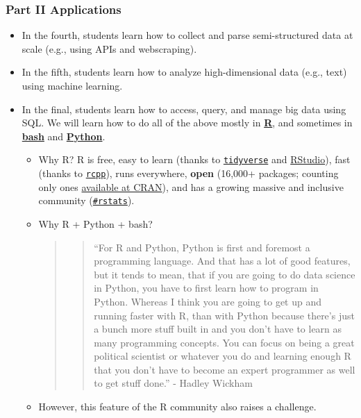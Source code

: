 \documentclass[
]{article}
\begin{document}
\hypertarget{part-ii-applications}{%
\subsubsection{Part II Applications}\label{part-ii-applications}}

\begin{itemize}
\item
  In the fourth, students learn how to collect and parse semi-structured
  data at scale (e.g., using APIs and webscraping).
\item
  In the fifth, students learn how to analyze high-dimensional data
  (e.g., text) using machine learning.
\item
  In the final, students learn how to access, query, and manage big data
  using SQL. We will learn how to do all of the above mostly in
  \href{https://www.r-project.org/about.html}{\textbf{R}}, and sometimes
  in \href{https://www.gnu.org/software/bash/}{\textbf{bash}} and
  \href{https://www.python.org/about/}{\textbf{Python}}.

  \begin{itemize}
  \item
    Why R? R is free, easy to learn (thanks to
    \href{https://www.tidyverse.org/}{\texttt{tidyverse}} and
    \href{https://rstudio.com/}{RStudio}), fast (thanks to
    \href{https://cran.r-project.org/web/packages/Rcpp/index.html}{\texttt{rcpp}}),
    runs everywhere, \textbf{open} (16,000+ packages; counting only ones
    \href{https://cran.r-project.org/web/packages/}{available at CRAN}),
    and has a growing massive and inclusive community
    (\href{https://twitter.com/search?q=\%23rstats\&src=typed_query}{\texttt{\#rstats}}).
  \item
    Why R + Python + bash?

    \begin{quote}
    \begin{quote}
    ``For R and Python, Python is first and foremost a programming
    language. And that has a lot of good features, but it tends to mean,
    that if you are going to do data science in Python, you have to
    first learn how to program in Python. Whereas I think you are going
    to get up and running faster with R, than with Python because
    there's just a bunch more stuff built in and you don't have to learn
    as many programming concepts. You can focus on being a great
    political scientist or whatever you do and learning enough R that
    you don't have to become an expert programmer as well to get stuff
    done.'' - Hadley Wickham
    \end{quote}
    \end{quote}
  \item
    However, this feature of the R community also raises a challenge.


\end{itemize}
\end{itemize}
\end{document}
